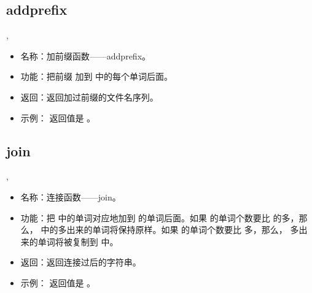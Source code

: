 \documentclass[a4paper,10pt]{sphinxmanual}
\begin{document}
\subsection{addprefix}
\label{\detokenize{functions:addprefix}}
\begin{sphinxVerbatim}[commandchars=\\\{\}]
 \PYGZlt{}\PYGZgt{},\PYGZlt{}\PYGZgt{}
\end{sphinxVerbatim}
\begin{itemize}
\item {} 
名称：加前缀函数——addprefix。

\item {} 
功能：把前缀  加到  中的每个单词后面。

\item {} 
返回：返回加过前缀的文件名序列。

\item {} 
示例：  返回值是  。

\end{itemize}


\subsection{join}
\label{\detokenize{functions:join}}
\begin{sphinxVerbatim}[commandchars=\\\{\}]
 \PYGZlt{}\PYGZgt{},\PYGZlt{}\PYGZgt{}
\end{sphinxVerbatim}
\begin{itemize}
\item {} 
名称：连接函数——join。

\item {} 
功能：把  中的单词对应地加到  的单词后面。如果  的单词个数要比  的多，那么，  中的多出来的单词将保持原样。如果
 的单词个数要比  多，那么，  多出来的单词将被复制到
 中。

\item {} 
返回：返回连接过后的字符串。

\item {} 
示例：  返回值是  。

\end{itemize}
\end{document}
